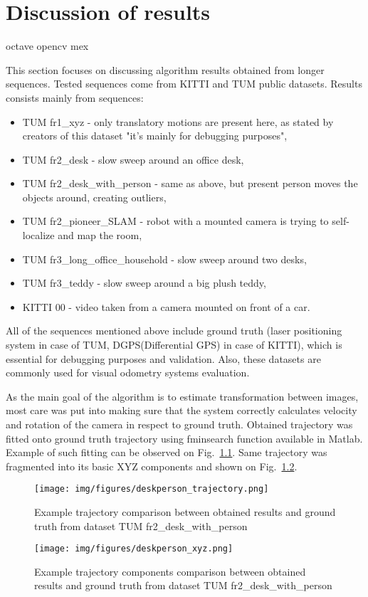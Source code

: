 \chapter{Discussion of results}
\label{cha:results}
octave opencv mex

This section focuses on discussing algorithm results obtained from longer sequences. Tested sequences come from KITTI and TUM public datasets. Results consists mainly from sequences:
\begin{itemize}
	\item TUM fr1\_xyz - only translatory motions are present here, as stated by creators of this dataset "it's mainly for debugging purposes",
	\item TUM fr2\_desk - slow sweep around an office desk,
	\item TUM fr2\_desk\_with\_person - same as above, but present person moves the objects around, creating outliers,
	\item TUM fr2\_pioneer\_SLAM - robot with a mounted camera is trying to self-localize and map the room,
	\item TUM fr3\_long\_office\_household - slow sweep around two desks,
	\item TUM fr3\_teddy - slow sweep around a big plush teddy,
	\item KITTI 00 - video taken from a camera mounted on front of a car.
\end{itemize}

All of the sequences mentioned above include ground truth (laser positioning system in case of TUM, DGPS(Differential GPS) in case of KITTI), which is essential for debugging purposes and validation. Also, these datasets are commonly used for visual odometry systems evaluation.

As the main goal of the algorithm is to estimate transformation between images, most care was put into making sure that the system correctly calculates velocity and rotation of the camera in respect to ground truth. Obtained trajectory was fitted onto ground truth trajectory using fminsearch function available in Matlab. Example of such fitting can be observed on Fig.~\ref{fig:traject}. Same trajectory was fragmented into its basic XYZ components and shown on Fig.~\ref{fig:trajectxyz}.

\begin{figure}[ht]
	\centering\texttt{[image: img/figures/deskperson\_trajectory.png]}
	\caption{ Example trajectory comparison between obtained results and ground truth from dataset TUM fr2\_desk\_with\_person }
	\label{fig:traject}
\end{figure}
\begin{figure}[ht]
	\centering\texttt{[image: img/figures/deskperson\_xyz.png]}
	\caption{ Example trajectory components comparison between obtained results and ground truth from dataset TUM fr2\_desk\_with\_person }
	\label{fig:trajectxyz}
\end{figure}

